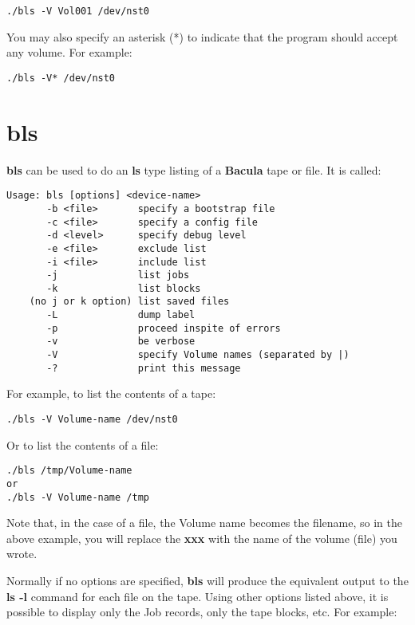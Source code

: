 \footnotesize
\begin{verbatim}
./bls -V Vol001 /dev/nst0
\end{verbatim}
\normalsize

You may also specify an asterisk (*) to indicate that the program should
accept any volume. For example: 

\footnotesize
\begin{verbatim}
./bls -V* /dev/nst0
\end{verbatim}
\normalsize

\section{bls}
\label{bls}

{\bf bls} can be used to do an {\bf ls} type listing of a {\bf Bacula} tape or
file. It is called: 

\footnotesize
\begin{verbatim}
Usage: bls [options] <device-name>
       -b <file>       specify a bootstrap file
       -c <file>       specify a config file
       -d <level>      specify debug level
       -e <file>       exclude list
       -i <file>       include list
       -j              list jobs
       -k              list blocks
    (no j or k option) list saved files
       -L              dump label
       -p              proceed inspite of errors
       -v              be verbose
       -V              specify Volume names (separated by |)
       -?              print this message
\end{verbatim}
\normalsize

For example, to list the contents of a tape: 

\footnotesize
\begin{verbatim}
./bls -V Volume-name /dev/nst0
\end{verbatim}
\normalsize

Or to list the contents of a file: 

\footnotesize
\begin{verbatim}
./bls /tmp/Volume-name
or
./bls -V Volume-name /tmp
\end{verbatim}
\normalsize

Note that, in the case of a file, the Volume name becomes the filename, so in
the above example, you will replace the {\bf xxx} with the name of the volume
(file) you wrote. 

Normally if no options are specified, {\bf bls} will produce the equivalent
output to the {\bf ls -l} command for each file on the tape. Using other
options listed above, it is possible to display only the Job records, only the
tape blocks, etc. For example: 

